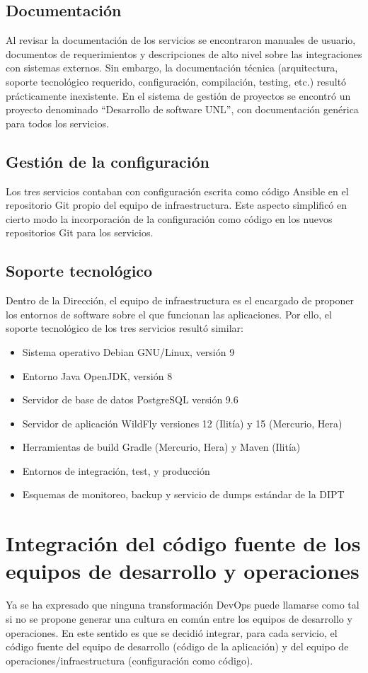 \subsection{Documentación}
%
Al revisar la documentación de los servicios se encontraron manuales
de usuario, documentos de requerimientos y descripciones de alto nivel
sobre las integraciones con sistemas externos. Sin embargo, la
documentación técnica (arquitectura, soporte tecnológico requerido,
configuración, compilación, testing, etc.) resultó prácticamente
inexistente. En el sistema de gestión de proyectos se encontró un
proyecto denominado ``Desarrollo de software UNL'', con documentación
genérica para todos los servicios.
%
\subsection{Gestión de la configuración}
%
Los tres servicios contaban con configuración escrita como código
Ansible en el repositorio Git propio del equipo de
infraestructura. Este aspecto simplificó en cierto modo la
incorporación de la configuración como código en los nuevos
repositorios Git para los servicios.
%
\subsection{Soporte tecnológico}
%
Dentro de la Dirección, el equipo de infraestructura es el encargado
de proponer los entornos de software sobre el que funcionan las
aplicaciones. Por ello, el soporte tecnológico de los tres servicios
resultó similar:
%
\begin{itemize}
\item Sistema operativo Debian GNU/Linux, versión 9
\item Entorno Java OpenJDK, versión 8
\item Servidor de base de datos PostgreSQL versión 9.6
\item Servidor de aplicación WildFly versiones 12 (Ilitía) y 15
  (Mercurio, Hera)
\item Herramientas de build Gradle (Mercurio, Hera) y Maven (Ilitía)
\item Entornos de integración, test, y producción
\item Esquemas de monitoreo, backup y servicio de dumps estándar de la
  DIPT
\end{itemize}
%
%
\section{Integración del código fuente de los equipos de desarrollo y operaciones}
%
Ya se ha expresado que ninguna transformación DevOps puede llamarse
como tal si no se propone generar una cultura en común entre los
equipos de desarrollo y operaciones. En este sentido es que se decidió
integrar, para cada servicio, el código fuente del equipo de
desarrollo (código de la aplicación) y del equipo de
operaciones/infraestructura (configuración como código).

